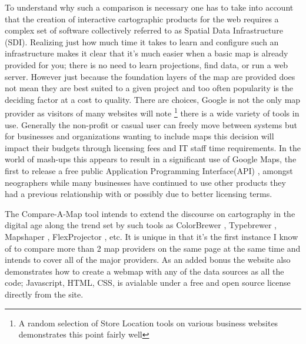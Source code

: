 \documentclass[12pt,letterpaper]{article}
\begin{document}
	To understand why such a comparison is necessary one has to take into account that the creation of interactive cartographic products for the web requires a complex set of software collectively referred to as Spatial Data Infrastructure (SDI). Realizing just how much time it takes to learn and configure such an infrastructure makes it clear that it's much easier when a basic map is already provided for you; there is no need to learn projections, find data, or run a web server. However just because the foundation layers of the map are provided does not mean they are best suited to a given project and too often popularity is the deciding factor at a cost to quality. There are choices, Google is not the only map provider as visitors of many websites will note \footnote{A random selection of Store Location tools on various business websites demonstrates this point fairly well} there is a wide variety of tools in use. Generally the non-profit or casual user can freely move between systems but for businesses and organizations wanting to include maps this decision will impact their budgets through  licensing fees and IT staff time requirements. In the world of mash-ups this appears to result in a significant use of Google Maps, the first to release a free public Application Programming Interface(API) \parencite{Turner2006}, amongst neographers while many businesses have continued to use other products they had a previous relationship with or possibly due to better licensing terms.
	  
	  The Compare-A-Map tool intends to extend the discourse on cartography in the digital age along the trend set by such tools as ColorBrewer \parencite{Harrower2003}, Typebrewer \parencite{Sheesley2008}, Mapshaper \parencite{Bloch2006}, FlexProjector \parencite{Jenny2010} , etc. It is unique in that it's the first instance I know of to compare more than 2 map providers on the same page at the same time and intends to cover all of the major providers. As an added bonus the website also demonstrates how to create a webmap with any of the data sources as all the code; Javascript, HTML, CSS, is avialable under a free and open source license directly from the site.
	
\end{document}

